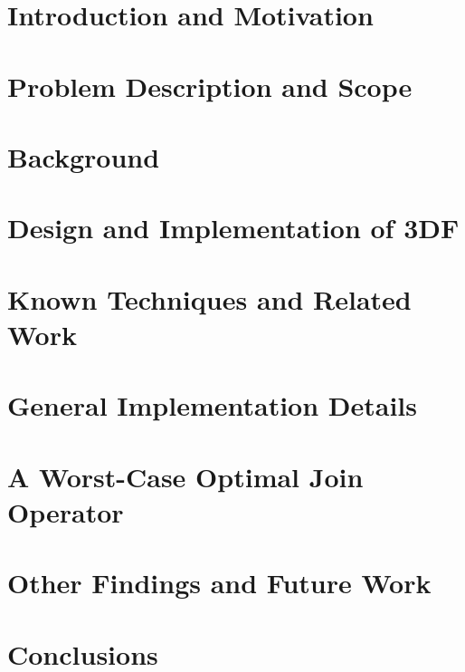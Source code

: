 \documentclass{article}
\begin{document}
\newpage

\section{Introduction and Motivation} \label{intro}

\newpage

\section{Problem Description and Scope} \label{problem}

\newpage

\section{Background} \label{background}

\newpage

\section{Design and Implementation of 3DF} \label{3df}

\newpage

\section{Known Techniques and Related Work} \label{known-techniques}

\newpage



\section{General Implementation Details} \label{implementation}

\newpage

\section{A Worst-Case Optimal Join Operator} \label{impl-hector}

\newpage

\section{Other Findings and Future Work} \label{future-work}

\newpage

\section{Conclusions} \label{conclusions}
\end{document}
